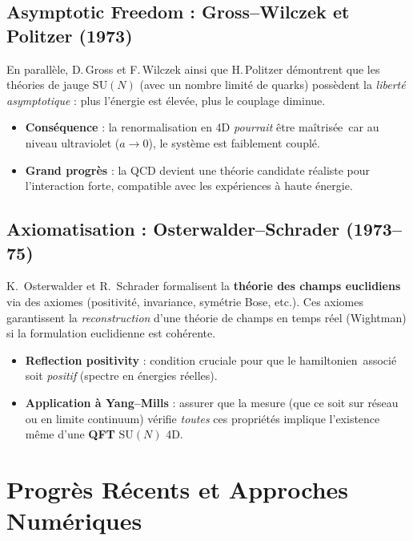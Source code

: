 \subsection*{Asymptotic Freedom : Gross--Wilczek et Politzer (1973)}
En parallèle, D.\,Gross et F.\,Wilczek \cite{GrossWilczek1973} ainsi que H.\,Politzer \cite{Politzer1973} démontrent que les théories de jauge \(\mathrm{SU}(N)\) (avec un nombre limité de quarks) possèdent la \emph{liberté asymptotique} : plus l’énergie est élevée, plus le couplage diminue.  
\begin{itemize}
	\item \textbf{Conséquence} : la renormalisation en 4D \textit{pourrait} être \og maîtrisée\fg\ car au niveau ultraviolet (\(a\to 0\)), le système est faiblement couplé.
	\item \textbf{Grand progrès} : la QCD devient une théorie candidate réaliste pour l’interaction forte, compatible avec les expériences à haute énergie.
\end{itemize}

\subsection*{Axiomatisation : Osterwalder--Schrader (1973--75)}
K.~Osterwalder et R.~Schrader \cite{OsterwalderSchrader1973,OsterwalderSchrader1975} formalisent la \textbf{théorie des champs euclidiens} via des axiomes (positivité, invariance, symétrie Bose, etc.). Ces axiomes garantissent la \emph{reconstruction} d'une théorie de champs en temps réel (Wightman) si la formulation euclidienne est cohérente.  
\begin{itemize}
	\item \textbf{Reflection positivity} : condition cruciale pour que le \og hamiltonien\fg\ associé soit \emph{positif} (spectre en énergies réelles).
	\item \textbf{Application à Yang--Mills} : assurer que la mesure (que ce soit sur réseau ou en limite continuum) vérifie \emph{toutes} ces propriétés implique l’existence même d’une \textbf{QFT} \(\mathrm{SU}(N)\) 4D.
\end{itemize}

\vspace{1em}

\section{Progrès Récents et Approches Numériques}
\label{sec:2.4}

